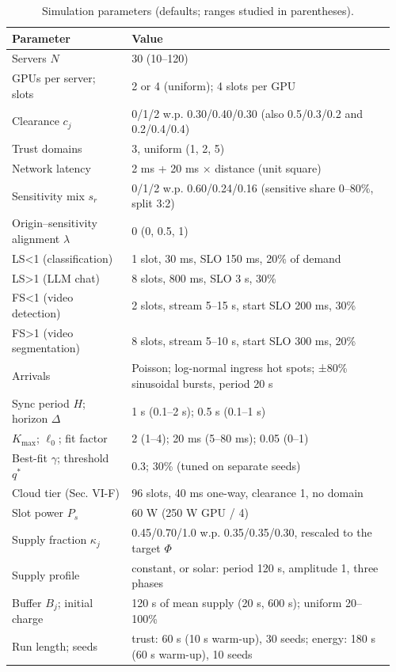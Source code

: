 \documentclass[journal]{IEEEtran}
\begin{document}
\begin{table}[!t]
\centering
\caption{Simulation parameters (defaults; ranges studied in parentheses).}
\footnotesize
\begin{tabular}{@{}p{0.3\linewidth}p{0.66\linewidth}@{}}
\toprule
Parameter & Value \\
\midrule
Servers \(N\) & 30 (10--120) \\
GPUs per server; slots & 2 or 4 (uniform); 4 slots per GPU \\
Clearance \(c_j\) & 0/1/2 w.p. 0.30/0.40/0.30 (also 0.5/0.3/0.2 and 0.2/0.4/0.4) \\
Trust domains & 3, uniform (1, 2, 5) \\
Network latency & 2 ms + 20 ms × distance (unit square) \\
Sensitivity mix \(s_r\) & 0/1/2 w.p. 0.60/0.24/0.16 (sensitive share 0--80\%, split 3:2) \\
Origin--sensitivity alignment \(\lambda\) & 0 (0, 0.5, 1) \\
LS\textless1 (classification) & 1 slot, 30 ms, SLO 150 ms, 20\% of demand \\
LS\textgreater1 (LLM chat) & 8 slots, 800 ms, SLO 3 s, 30\% \\
FS\textless1 (video detection) & 2 slots, stream 5--15 s, start SLO 200 ms, 30\% \\
FS\textgreater1 (video segmentation) & 8 slots, stream 5--10 s, start SLO 300 ms, 20\% \\
Arrivals & Poisson; log-normal ingress hot spots; ±80\% sinusoidal bursts, period 20 s \\
Sync period \(H\); horizon \(\Delta\) & 1 s (0.1--2 s); 0.5 s (0.1--1 s) \\
\(K_{\max}\); \(\ell_0\); fit factor & 2 (1--4); 20 ms (5--80 ms); 0.05 (0--1) \\
Best-fit \(\gamma\); threshold \(q^\ast\) & 0.3; 30\% (tuned on separate seeds) \\
Cloud tier (Sec. VI-F) & 96 slots, 40 ms one-way, clearance 1, no domain \\
Slot power \(P_s\) & 60 W (250 W GPU / 4) \\
Supply fraction \(\kappa_j\) & 0.45/0.70/1.0 w.p. 0.35/0.35/0.30, rescaled to the target \(\Phi\) \\
Supply profile & constant, or solar: period 120 s, amplitude 1, three phases \\
Buffer \(B_j\); initial charge & 120 s of mean supply (20 s, 600 s); uniform 20--100\% \\
Run length; seeds & trust: 60 s (10 s warm-up), 30 seeds; energy: 180 s (60 s warm-up), 10 seeds \\
\bottomrule
\end{tabular}
\end{table}
\end{document}
